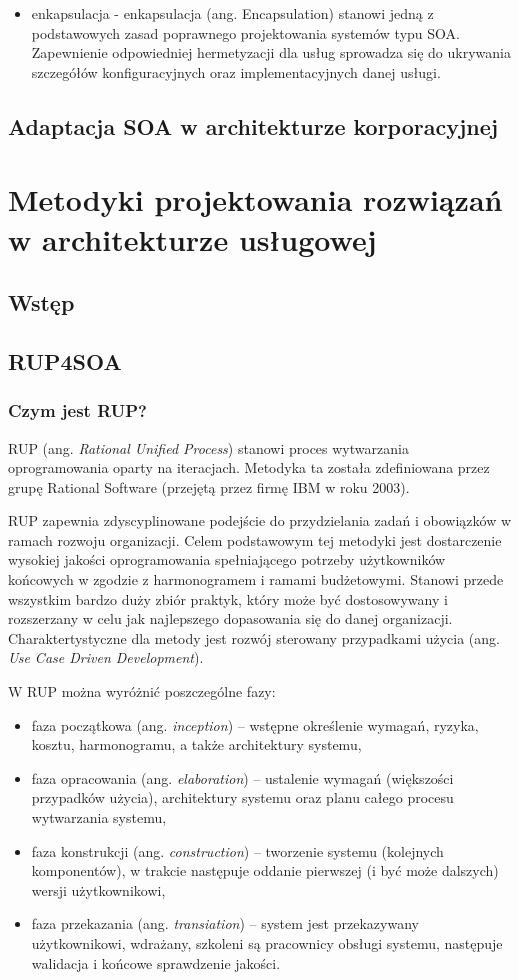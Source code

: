 \begin{itemize}
\item{enkapsulacja - enkapsulacja (ang. Encapsulation) stanowi jedną z podstawowych zasad poprawnego projektowania systemów typu SOA. Zapewnienie odpowiedniej hermetyzacji dla usług sprowadza się do ukrywania szczegółów konfiguracyjnych oraz implementacyjnych danej usługi.}
\end{itemize}

\section{Adaptacja SOA w architekturze korporacyjnej}

\chapter{Metodyki projektowania rozwiązań w architekturze usługowej}
\section{Wstęp}
\section{RUP4SOA}
\subsection{Czym jest RUP?}
RUP (ang. \textit{Rational Unified Process}) stanowi proces  wytwarzania oprogramowania oparty na iteracjach. Metodyka ta została zdefiniowana przez grupę Rational Software (przejętą przez firmę IBM w roku 2003). 

RUP zapewnia zdyscyplinowane podejście do przydzielania zadań i obowiązków w ramach rozwoju organizacji. Celem podstawowym tej metodyki jest dostarczenie wysokiej jakości oprogramowania spełniającego potrzeby użytkowników końcowych w zgodzie z harmonogramem i ramami budżetowymi.
\cite{RUPIntRat} Stanowi przede wszystkim bardzo duży zbiór praktyk, który może być dostosowywany i rozszerzany w celu jak najlepszego dopasowania się do danej organizacji. Charaktertystyczne dla metody jest rozwój sterowany przypadkami użycia (ang. \textit{Use Case Driven Development}).\cite{RUPMartFow}

W RUP można wyróżnić poszczególne fazy:
\begin{itemize}
\item{faza początkowa (ang. \textit{inception}) – wstępne określenie wymagań, ryzyka, kosztu, harmonogramu, a także architektury systemu,}
\item{faza opracowania (ang. \textit{elaboration}) – ustalenie wymagań (większości przypadków użycia), architektury systemu oraz planu całego procesu wytwarzania systemu,}
\item{faza konstrukcji (ang. \textit{construction}) – tworzenie systemu (kolejnych komponentów), w trakcie następuje oddanie pierwszej (i być może dalszych) wersji użytkownikowi,}
\item{faza przekazania (ang. \textit{transiation}) – system jest przekazywany użytkownikowi, wdrażany, szkoleni są pracownicy obsługi systemu, następuje walidacja i końcowe sprawdzenie jakości.}\cite{RUPIntRat}
\end{itemize}
